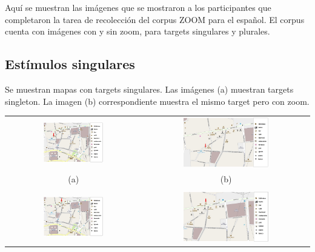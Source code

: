 Aqu\'i se muestran las im\'agenes que se mostraron a los participantes que completaron la tarea de recolecci\'on del corpus ZOOM para el espa\~nol. El corpus cuenta con im\'agenes con y sin zoom, para targets singulares y plurales.%

\subsection{Est\'imulos singulares}

Se muestran mapas con targets singulares. Las im\'agenes (a) muestran targets singleton. La imagen (b) correspondiente muestra el mismo target pero con zoom.

\noindent
\begin{center}
\begin{tabular}{c c}
\includegraphics[width=0.46\textwidth]{images/corpus/mapa3.png} & \includegraphics[width=0.53\textwidth]{images/corpus/mapa13.png} \\
(a) & (b) \\
& \\
\includegraphics[width=0.46\textwidth]{images/corpus/mapa4.png} & \includegraphics[width=0.53\textwidth]{images/corpus/mapa14.png} \\

\end{tabular}
\end{center}

